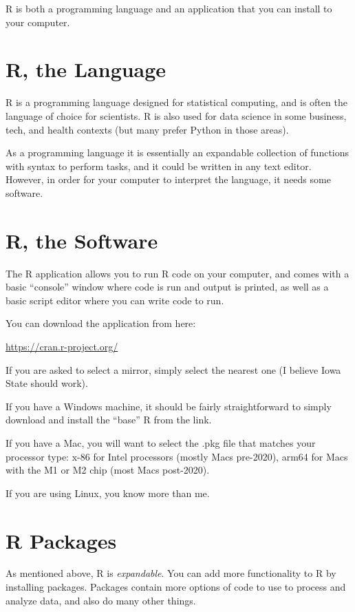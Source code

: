 \documentclass[
  letterpaper,
  DIV=11,
  numbers=noendperiod]{scrreprt}
\begin{document}
R is both a programming language and an application that you can install
to your computer.

\section{R, the Language}\label{r-the-language}

R is a programming language designed for statistical computing, and is
often the language of choice for scientists. R is also used for data
science in some business, tech, and health contexts (but many prefer
Python in those areas).

As a programming language it is essentially an expandable collection of
functions with syntax to perform tasks, and it could be written in any
text editor. However, in order for your computer to interpret the
language, it needs some software.

\section{R, the Software}\label{r-the-software}

The R application allows you to run R code on your computer, and comes
with a basic ``console'' window where code is run and output is printed,
as well as a basic script editor where you can write code to run.

You can download the application from here:

\url{https://cran.r-project.org/}

If you are asked to select a mirror, simply select the nearest one (I
believe Iowa State should work).

If you have a Windows machine, it should be fairly straightforward to
simply download and install the ``base'' R from the link.

If you have a Mac, you will want to select the .pkg file that matches
your processor type: x-86 for Intel processors (mostly Macs pre-2020),
arm64 for Macs with the M1 or M2 chip (most Macs post-2020).

If you are using Linux, you know more than me.

\section{R Packages}\label{r-packages}

As mentioned above, R is \emph{expandable}. You can add more
functionality to R by installing packages. Packages contain more options
of code to use to process and analyze data, and also do many other
things.
\end{document}
